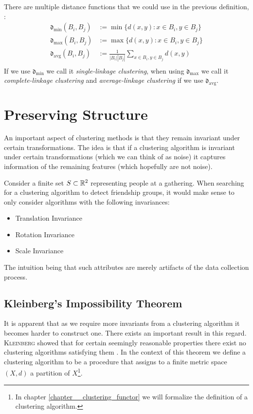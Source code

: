There are multiple distance functions that we could use in the previous definition, \eg :
\begin{align*}
\mathfrak{d}_\mathrm{min} (B_i, B_j) &:= \min\{d(x,y): x \in B_i, y \in B_j\}\\
\mathfrak{d}_\mathrm{max} (B_i, B_j) &:= \max\{d(x,y): x \in B_i, y \in B_j\}\\
\mathfrak{d}_\mathrm{avg}(B_i,B_j) &:= \frac{1}{|B_i||B_j|} \sum_{x \in B_i, y \in B_j} d(x,y)\\
\end{align*}
If we use $\mathfrak{d}_\mathrm{min}$ we call it \emph{single-linkage clustering}, when using $\mathfrak{d}_\mathrm{max}$ we call it \emph{complete-linkage clustering} and \emph{average-linkage clustering} if we use $\mathfrak{d}_\mathrm{avg}$.

\section{Preserving Structure}
\label{seciton__preserving_structure}
An important aspect of clustering methods is that they remain invariant under certain transformations.
The idea is that if a clustering algorithm is invariant under certain transformations (which we can think of as noise) it captures information of the remaining features (which hopefully are not noise).

\begin{example}{}{}
Consider a finite set $S \subset \mathbb R^2$ representing people at a gathering. When searching for a clustering algorithm to detect friendship groups, it would make sense to only consider algorithms with the following invariances:
\begin{itemize}
    \item Translation Invariance
    \item Rotation Invariance
    \item Scale Invariance
\end{itemize}
The intuition being that such attributes are merely artifacts of the data collection process.
\end{example}

\subsection{Kleinberg's Impossibility Theorem}
It is apparent that as we require more invariants from a clustering algorithm it becomes harder to construct one.
There exists an important result in this regard.
\textsc{Kleinberg} showed that for certain seemingly reasonable properties there exist no clustering algorithms satisfying them \cite{Kleinberg2002}.
In the context of this theorem we define a clustering algorithm to be a procedure that assigns to a finite metric space $(X,d)$ a partition of $X$\footnote{In chapter \ref{chapter__clustering_functor} we will formalize the definition of a clustering algorithm.}.

